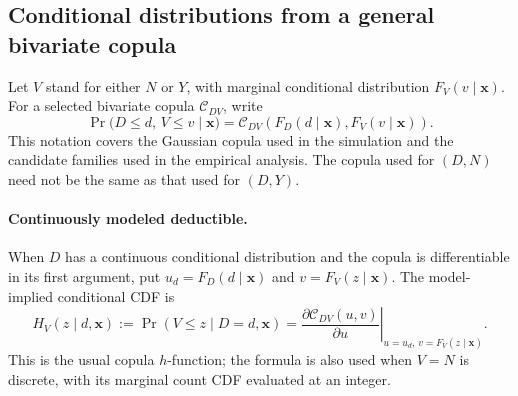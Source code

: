 \documentclass[11pt]{article}
\begin{document}
{\subsection{Conditional distributions from a general bivariate copula}
\label{app:premium-copula}

Let $V$ stand for either $N$ or $Y$, with marginal conditional distribution
$F_V(v\mid\boldsymbol{x})$. For a selected bivariate copula $\mathcal C_{DV}$,
write
\begin{equation}
 \Pr\bigl(D\le d,\,V\le v\mid\boldsymbol{x}\bigr)
 =\mathcal C_{DV}\!\left(
       F_D(d\mid\boldsymbol{x}),F_V(v\mid\boldsymbol{x})
   \right).
 \label{eq:app-premium-copula}
\end{equation}
This notation covers the Gaussian copula used in the simulation and the
candidate families used in the empirical analysis. The copula used for
$(D,N)$ need not be the same as that used for $(D,Y)$.

\paragraph{Continuously modeled deductible.}
When $D$ has a continuous conditional distribution and the copula is
differentiable in its first argument, put
$u_d=F_D(d\mid\boldsymbol{x})$ and
$v=F_V(z\mid\boldsymbol{x})$. The model-implied conditional CDF is
\begin{equation}
 H_V(z\mid d,\boldsymbol{x})
 :=\Pr(V\le z\mid D=d,\boldsymbol{x})
 =\left.\frac{\partial\mathcal C_{DV}(u,v)}{\partial u}
      \right|_{u=u_d,\,v=F_V(z\mid\boldsymbol{x})}.
 \label{eq:app-premium-cont}
\end{equation}
This is the usual copula $h$-function; the formula is also used when $V=N$
is discrete, with its marginal count CDF evaluated at an integer.

}
\end{document}
